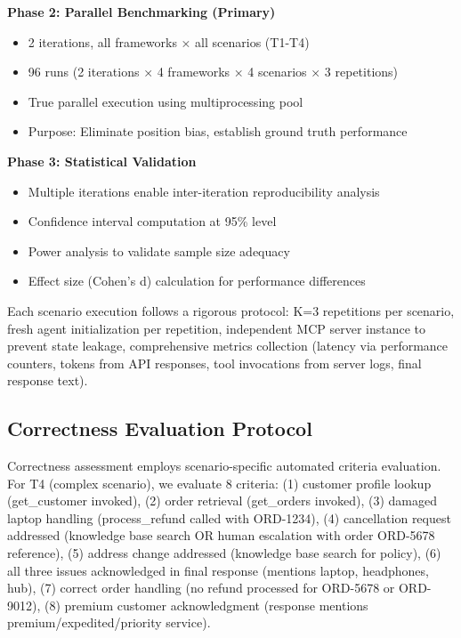 \documentclass[sigconf,nonacm]{acmart}
\begin{document}
\textbf{Phase 2: Parallel Benchmarking (Primary)}
\begin{itemize}
\item 2 iterations, all frameworks × all scenarios (T1-T4)
\item 96 runs (2 iterations × 4 frameworks × 4 scenarios × 3 repetitions)
\item True parallel execution using multiprocessing pool
\item Purpose: Eliminate position bias, establish ground truth performance
\end{itemize}

\textbf{Phase 3: Statistical Validation}
\begin{itemize}
\item Multiple iterations enable inter-iteration reproducibility analysis
\item Confidence interval computation at 95\% level
\item Power analysis to validate sample size adequacy
\item Effect size (Cohen's d) calculation for performance differences
\end{itemize}

Each scenario execution follows a rigorous protocol: K=3 repetitions per scenario, fresh agent initialization per repetition, independent MCP server instance to prevent state leakage, comprehensive metrics collection (latency via performance counters, tokens from API responses, tool invocations from server logs, final response text).

\subsection{Correctness Evaluation Protocol}

Correctness assessment employs scenario-specific automated criteria evaluation. For T4 (complex scenario), we evaluate 8 criteria: (1) customer profile lookup (get\_customer invoked), (2) order retrieval (get\_orders invoked), (3) damaged laptop handling (process\_refund called with ORD-1234), (4) cancellation request addressed (knowledge base search OR human escalation with order ORD-5678 reference), (5) address change addressed (knowledge base search for policy), (6) all three issues acknowledged in final response (mentions laptop, headphones, hub), (7) correct order handling (no refund processed for ORD-5678 or ORD-9012), (8) premium customer acknowledgment (response mentions premium/expedited/priority service).
\end{document}
